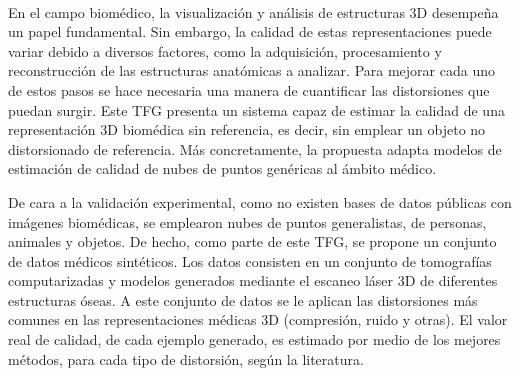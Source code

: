 \chapter*{}


% 


\thispagestyle{empty}

\begin{center}
{\large\bfseries \myTitle}\\
\end{center}
\begin{center}
\myName\\
\end{center}

\\

\\
En el campo biomédico, la visualización y análisis de estructuras 3D
desempeña un papel fundamental. 
Sin embargo, la calidad de estas representaciones puede variar debido a diversos 
factores, como la adquisición, procesamiento y reconstrucción de las estructuras anatómicas a analizar. 
Para mejorar cada uno de estos pasos se hace necesaria una manera de cuantificar las distorsiones que puedan surgir. 
Este TFG presenta un sistema capaz de estimar la calidad de 
una representación 3D biomédica sin referencia, es decir, sin emplear un objeto 
no distorsionado de referencia. Más concretamente, la propuesta 
adapta modelos de estimación de calidad de nubes de puntos genéricas 
al ámbito médico. 
\smallskip

De cara a la validación experimental, como no existen bases de datos públicas con imágenes 
biomédicas, se emplearon nubes de puntos generalistas, de personas, animales y objetos. 
De hecho, como parte de este TFG, se propone un conjunto de datos médicos sintéticos.
Los datos consisten en un conjunto de tomografías computarizadas y modelos 
generados mediante el escaneo láser 3D de diferentes estructuras óseas. 
A este conjunto de datos se le aplican las distorsiones más comunes 
en las representaciones médicas 3D (compresión, ruido y otras). 
El valor real de calidad, de cada ejemplo generado, es estimado por medio de 
los mejores métodos, para cada tipo de distorsión, según la literatura. 
\smallskip

